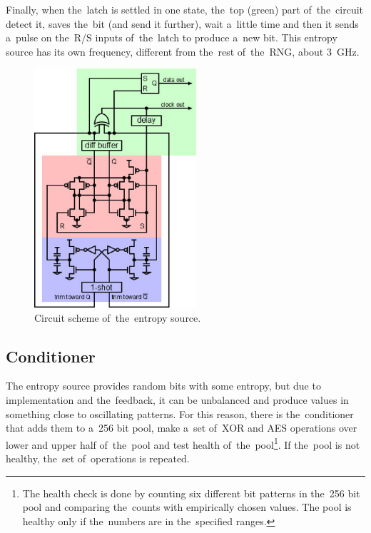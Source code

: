 Finally, when the~latch is settled in one state, the~top (green) part 
of~the~circuit detect it, saves the~bit (and send it further), wait 
a~little time and then it sends a~pulse on the~R/S inputs of~the~latch 
to produce a~new bit. This entropy source has its own frequency, different 
from the~rest of~the~RNG, about 3~GHz.

\begin{figure}[h!]
  \centering
 \includegraphics[width=6cm,keepaspectratio]{fig/entropy-source-circuit} %
\caption{Circuit scheme of~the~entropy source\cite{UnderstandingRdRandElectronic}.}
\label{fig:ES-circuit}
\end{figure}

\subsection{Conditioner}
The entropy source provides random bits with some entropy, but due to implementation and the~feedback, it can be unbalanced and produce values in something close to oscillating patterns. For this reason, there is the~conditioner that adds them to a~256 bit pool, make a~set of~XOR and AES operations over lower and upper half of~the~pool and test health of~the~pool\footnote{The health check is done by counting six different bit patterns in the~256 bit pool and comparing the~counts with empirically chosen values. The pool is healthy only if the~numbers are in the~specified ranges.}\cite{AnalysisOfDRNG}\cite{UnderstandingRdRandElectronic}. If the~pool is not healthy, the~set of~operations is repeated. 

